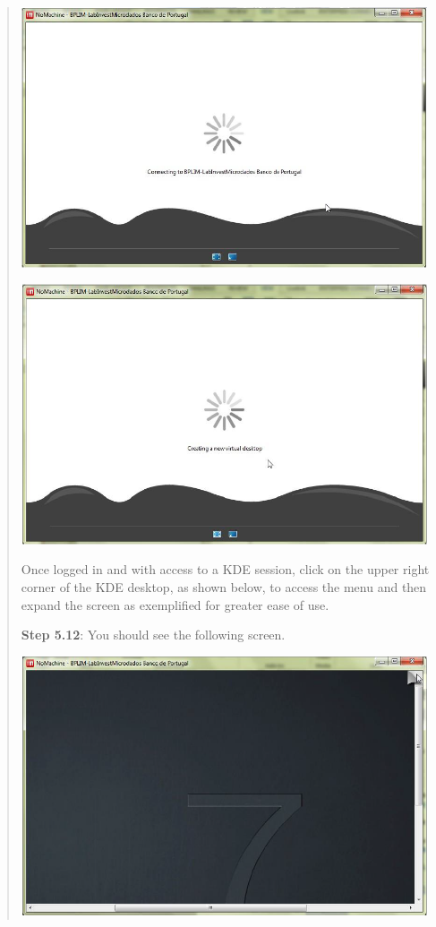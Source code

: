 \documentclass[
  11pt,
  a4paper,
]{article}
\begin{document}
\begin{quote}
\includegraphics[width=4.72441in,height=3.02971in]{./media/image36.png}

\includegraphics[width=4.72441in,height=3.02389in]{./media/image37.png}

Once logged in and with access to a KDE session, click on the upper
right corner of the KDE desktop, as shown below, to access the menu and
then expand the screen as exemplified for greater ease of use.

\textbf{Step 5.12}: You should see the following screen.

\includegraphics[width=4.72441in,height=3.01274in]{./media/image38.png}


\end{quote}
\end{document}
